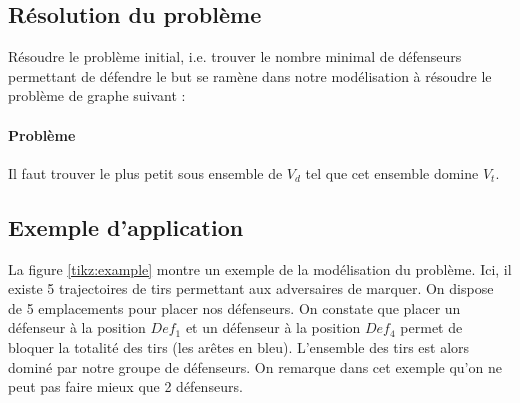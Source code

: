 \documentclass[12pt]{article}
\begin{document}
\subsection{Résolution du problème}
Résoudre le problème initial, i.e. trouver le nombre minimal de défenseurs permettant de défendre le but se ramène dans notre modélisation à résoudre le problème de graphe suivant :

\paragraph{Problème} \textcolor{problem}{Il faut trouver le plus petit sous ensemble de $V_d$ tel que cet ensemble domine $V_t$.}

\subsection{Exemple d'application}

La figure \ref{tikz:example} montre un exemple de la modélisation du problème. Ici, il existe 5 trajectoires de tirs permettant aux adversaires de marquer. On dispose de 5 emplacements pour placer nos défenseurs.  On constate que placer un défenseur à la position $Def_1$ et un défenseur à la position $Def_4$ permet de bloquer la totalité des tirs (les arêtes en bleu). L'ensemble des tirs est alors dominé par notre groupe de défenseurs. On remarque dans cet exemple qu'on ne peut pas faire mieux que 2 défenseurs.
\end{document}
